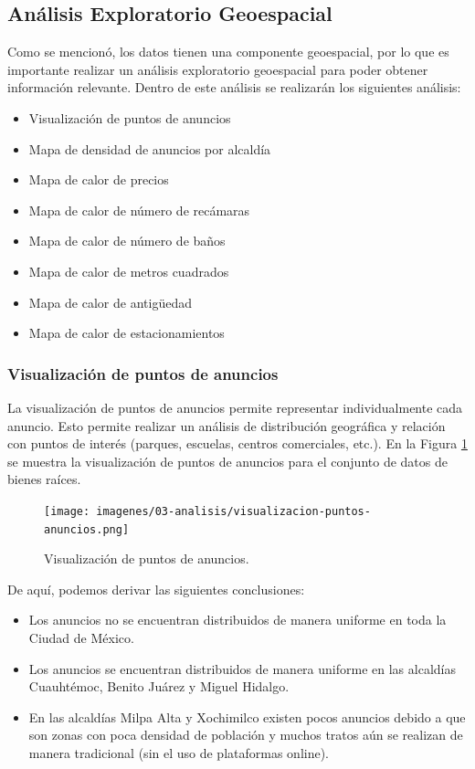 \subsection{Análisis Exploratorio Geoespacial}

Como se mencionó, los datos tienen una componente geoespacial, por lo que es
importante realizar un análisis exploratorio geoespacial para poder obtener
información relevante. Dentro de este análisis se realizarán los siguientes
análisis:

\begin{itemize}
  \item Visualización de puntos de anuncios
  \item Mapa de densidad de anuncios por alcaldía
  \item Mapa de calor de precios
  \item Mapa de calor de número de recámaras
  \item Mapa de calor de número de baños
  \item Mapa de calor de metros cuadrados
  \item Mapa de calor de antigüedad
  \item Mapa de calor de estacionamientos
\end{itemize}

\subsubsection{Visualización de puntos de anuncios}

La visualización de puntos de anuncios permite representar individualmente cada
anuncio. Esto permite realizar un análisis de distribución geográfica y relación
con puntos de interés (parques, escuelas, centros comerciales, etc.). En la
Figura \ref{fig:visualizacion_puntos_anuncios} se muestra la visualización de
puntos de anuncios para el conjunto de datos de bienes raíces.

\begin{figure}[H]
  \centering
  \texttt{[image: imagenes/03-analisis/visualizacion-puntos-anuncios.png]}
  \caption{Visualización de puntos de anuncios.}
  \label{fig:visualizacion_puntos_anuncios}
\end{figure}

De aquí, podemos derivar las siguientes conclusiones:

\begin{itemize}
  \item Los anuncios no se encuentran distribuidos de manera uniforme en toda la
  Ciudad de México.
  \item Los anuncios se encuentran distribuidos de manera uniforme en las
  alcaldías Cuauhtémoc, Benito Juárez y Miguel Hidalgo.
\item En las alcaldías Milpa Alta y Xochimilco existen pocos anuncios debido a
  que son zonas con poca densidad de población y muchos tratos aún se realizan
    de manera tradicional (sin el uso de plataformas online).
\end{itemize}

